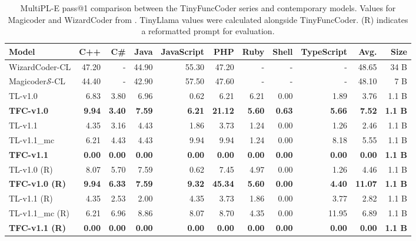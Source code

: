 \begin{table}[!h]
    \centering
    \caption{MultiPL-E pass@1 comparison between the TinyFuncCoder series and contemporary models. Values for Magicoder and WizardCoder from \cite{Wei.2024}. TinyLlama values were calculated alongside TinyFuncCoder. (R) indicates a reformatted prompt for evaluation.}
    \scriptsize
    \begin{tabular}{l|rrrrrrrrr|r}
        \hline
        Model & C++ & C\# & Java & JavaScript & PHP & Ruby & Shell & TypeScript & Avg. & Size \\
        \hline
        WizardCoder-CL & 47.20 & - & 44.90 & 55.30 & 47.20 & - & - & - & 48.65 & 34 B \\
        Magicoder$\mathcal{S}$-CL & 44.40 & - & 42.90 & 57.50 & 47.60 & - & - & - & 48.10 & 7 B \\
        \hline
        TL-v1.0 & 6.83 & 3.80 & 6.96 & 0.62 & 6.21 & 6.21 & 0.00 & 1.89 & 3.76 & 1.1 B \\
        \textbf{TFC-v1.0} & \textbf{9.94} & \textbf{3.40} & \textbf{7.59} & \textbf{6.21} & \textbf{21.12} & \textbf{5.60} & \textbf{0.63} & \textbf{5.66} & \textbf{7.52} & \textbf{1.1 B} \\
        TL-v1.1 & 4.35 & 3.16 & 4.43 & 1.86 & 3.73 & 1.24 & 0.00 & 1.26 & 2.46 & 1.1 B \\
        TL-v1.1\_mc & 6.21 & 4.43 & 4.43 & 9.94 & 9.94 & 1.24 & 0.00 & 8.18 & 5.55 & 1.1 B \\
        \textbf{TFC-v1.1} & \textbf{0.00} & \textbf{0.00} & \textbf{0.00} & \textbf{0.00} & \textbf{0.00} & \textbf{0.00} & \textbf{0.00} & \textbf{0.00} & \textbf{0.00} & \textbf{1.1 B} \\
        \hline
        TL-v1.0 (R) & 8.07 & 5.70 & 7.59 & 0.62 & 7.45 & 4.97 & 0.00 & 1.26 & 4.46 & 1.1 B \\
        \textbf{TFC-v1.0 (R)} & \textbf{9.94} & \textbf{6.33} & \textbf{7.59} & \textbf{9.32} & \textbf{45.34} & \textbf{5.60} & \textbf{0.00} & \textbf{4.40} & \textbf{11.07} & \textbf{1.1 B} \\
        TL-v1.1 (R) & 4.35 & 2.53 & 2.00 & 4.35 & 3.73 & 1.86 & 0.00 & 3.77 & 2.82 & 1.1 B \\
        TL-v1.1\_mc (R) & 6.21 & 6.96 & 8.86 & 8.07 & 8.70 & 4.35 & 0.00 & 11.95 & 6.89 & 1.1 B \\
        \textbf{TFC-v1.1 (R)} & \textbf{0.00} & \textbf{0.00} & \textbf{0.00} & \textbf{0.00} & \textbf{0.00} & \textbf{0.00} & \textbf{0.00} & \textbf{0.00} & \textbf{0.00} & \textbf{1.1 B} \\
        \hline
    \end{tabular}
    \label{tab:multiplefeat}
\end{table}

